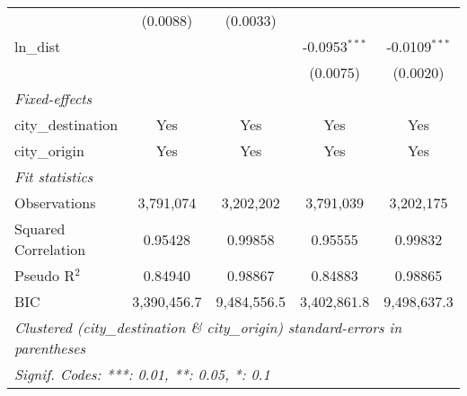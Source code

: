 \begin{tabular}{lcccc}
                                           & (0.0088)        & (0.0033)        &                 &   \\   
   ln\_dist                                &                 &                 & -0.0953$^{***}$ & -0.0109$^{***}$\\   
                                           &                 &                 & (0.0075)        & (0.0020)\\   
   \midrule
   \emph{Fixed-effects}\\
   city\_destination                       & Yes             & Yes             & Yes             & Yes\\  
   city\_origin                            & Yes             & Yes             & Yes             & Yes\\  
   \midrule
   \emph{Fit statistics}\\
   Observations                            & 3,791,074       & 3,202,202       & 3,791,039       & 3,202,175\\  
   Squared Correlation                     & 0.95428         & 0.99858         & 0.95555         & 0.99832\\  
   Pseudo R$^2$                            & 0.84940         & 0.98867         & 0.84883         & 0.98865\\  
   BIC                                     & 3,390,456.7     & 9,484,556.5     & 3,402,861.8     & 9,498,637.3\\  
   \midrule \midrule
   \multicolumn{5}{l}{\emph{Clustered (city\_destination \& city\_origin) standard-errors in parentheses}}\\
   \multicolumn{5}{l}{\emph{Signif. Codes: ***: 0.01, **: 0.05, *: 0.1}}\\
\end{tabular}
\par\endgroup


